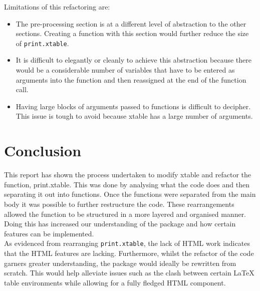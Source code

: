 \documentclass{memoir}\usepackage[]{graphicx}\usepackage[]{color}
\newcommand{\pkg}[1]{{\fontseries{b}\selectfont #1}}
\let\code=\texttt
\newcommand{\latex}{\LaTeX\xspace}
\begin{document}
\noindent Limitations of this refactoring are:
\begin{itemize}
  \item The pre-processing section is at a different level of abstraction to the other sections. Creating a function with this section would further reduce the size of \code{print.xtable}.
  \item It is difficult to elegantly or cleanly to achieve this abstraction because there would be a considerable number of variables that have to be entered as arguments into the function and then reassigned at the end of the function call.
  \item Having large blocks of arguments passed to functions is difficult to decipher. This issue is tough to avoid because \pkg{xtable} has a large number of arguments.
\end{itemize}



\chapter{Conclusion}

This report has shown the process undertaken to modify \pkg{xtable} and refactor the function, \pkg{print.xtable}. This was done by analysing what the code does and then separating it out into functions. Once the functions were separated from the main body it was possible to further restructure the code. These rearrangements allowed the function to be structured in a more layered and organised manner. Doing this has increased our understanding of the package and how certain features can be implemented.\\ 

As evidenced from rearranging \code{print.xtable}, the lack of HTML work indicates that the HTML features are lacking. Furthermore, whilst the refactor of the code garners greater understanding, the package would ideally be rewritten from scratch. This would help alleviate issues such as the clash between certain \latex table environments while allowing for a fully fledged HTML component.\\


\backmatter

\nocite{*}
\printbibliography[title={References}]



\appendix

\renewcommand\thechapter{}
\end{document}

